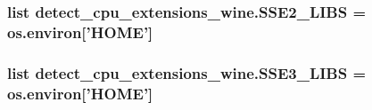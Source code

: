 \subsubsection[{S\+S\+E2\+\_\+\+L\+I\+B\+S}]{\setlength{\rightskip}{0pt plus 5cm}list detect\+\_\+cpu\+\_\+extensions\+\_\+wine.\+S\+S\+E2\+\_\+\+L\+I\+B\+S = os.\+environ\mbox{[}'H\+O\+M\+E'\mbox{]}}\label{namespacedetect__cpu__extensions__wine_aa827c44f0460e12f7b01b317c173313b}
\hypertarget{namespacedetect__cpu__extensions__wine_ae97f704d3bf0ed4d08bad685663ee6e2}{}
\subsubsection[{S\+S\+E3\+\_\+\+L\+I\+B\+S}]{\setlength{\rightskip}{0pt plus 5cm}list detect\+\_\+cpu\+\_\+extensions\+\_\+wine.\+S\+S\+E3\+\_\+\+L\+I\+B\+S = os.\+environ\mbox{[}'H\+O\+M\+E'\mbox{]}}\label{namespacedetect__cpu__extensions__wine_ae97f704d3bf0ed4d08bad685663ee6e2}
